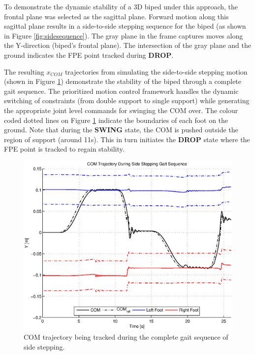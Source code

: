 To demonstrate the dynamic stability of a 3D biped under this approach, the frontal plane was selected as the sagittal plane. Forward motion along this sagittal plane results in a side-to-side stepping sequence for the biped (as shown in Figure \ref{fig:sidesequence}). The gray plane in the frame captures moves along the Y-direction (biped's frontal plane). The intersection of the gray plane and the ground indicates the FPE point tracked during \textbf{DROP}. 

The resulting $x_{COM}$ trajectories from simulating the side-to-side stepping motion (shown in Figure \ref{fig:sidecomtraj}) demonstrate the stability of the biped through a complete gait sequence. The prioritized motion control framework handles the dynamic switching of constraints (from double support to single support) while generating the appropriate joint level commands for swinging the COM over. The colour coded dotted lines on Figure \ref{fig:sidecomtraj} indicate the boundaries of each foot on the ground. Note that during the \textbf{SWING} state, the COM is pushed outside the region of support (around 11s). This in turn initiates the \textbf{DROP} state where the FPE point is tracked to regain stability.

\begin{figure}[!h]
	\centering
    \includegraphics[scale=0.6]{fig/simulations/sidecomtraj.eps}
  	\caption{COM trajectory being tracked during the complete gait sequence of side stepping.}
	\label{fig:sidecomtraj}
\end{figure}



